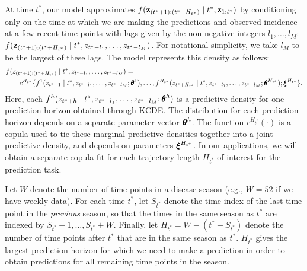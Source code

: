\documentclass[times, doublespace]{simauth}\usepackage[]{graphicx}\usepackage[]{color}
\begin{document}
At time $t^*$, our model approximates $f({\bf z}_{(t^* + 1):(t^* + H_{t^*})} \mid t^*, {\bf z}_{1:t^*})$
by conditioning only on the time at which we are making the predictions and
observed incidence at a few recent time points with lags given by the non-negative integers $l_1, \ldots, l_M$:
$f({\bf z}_{(t^* + 1):(t^* + H_{t^*})} \mid t^*, z_{t^* - l_1}, \ldots, z_{t^* -
l_M})$.  For notational simplicity, we take $l_M$ to be the largest of these
lags.  The model represents this density as follows:
\begin{align}
&f(z_{(t^* + 1):(t^* + H_{t^*})} \mid t^*, z_{t^* - l_1}, \ldots, z_{t^* - l_M}) = \nonumber \\
&\qquad c^{H_{t^*}}\{f^{1}(z_{t^* + 1} \mid t^*, z_{t^* - l_1}, \ldots, z_{t^* - l_M}; \btheta^1), \ldots, f^{H_{t^*}}(z_{t^* + H_{t^*}} \mid t^*, z_{t^* - l_1}, \ldots, z_{t^* - l_M}; \btheta^{H_{t^*}}) ; \bxi^{H_{t^*}}\}. \label{eqn:ModelKCDECopula}
\end{align}
Here, each $f^{h}(z_{t^* + h} \mid t^*, z_{t^* - l_1}, \ldots, z_{t^* - l_M};
\btheta^h)$ is a predictive density for one prediction horizon obtained through KCDE.  The
distribution for each prediction horizon depends on a separate parameter vector $\btheta^h$.
The function $c^{H_{t^*}}(\cdot)$ is a copula
used to tie these marginal predictive densities together into a joint predictive
density, and depends on parameters $\bxi^{H_{t^*}}$.  In our
applications, we will obtain a separate copula fit for each trajectory length
$H_{t^*}$ of interest for the prediction task.

Let $W$ denote the number of time
points in a disease season ({e.g.}, $W = 52$ if we have weekly data).
For each time $t^*$, let $S_{t^*}$ denote the time index of the last time
point in the \textit{previous} season, so that the times in the same season
as $t^*$ are indexed by $S_{t^*} + 1, \ldots, S_{t^*} + W$.
Finally, let $H_{t^*} = W - (t^* - S_{t^*})$ denote the number of time points
after $t^*$ that are in the same season as $t^*$.  $H_{t^*}$ gives the largest
prediction horizon for which we need to make a prediction in order to obtain
predictions for all remaining time points in the season.
\end{document}
